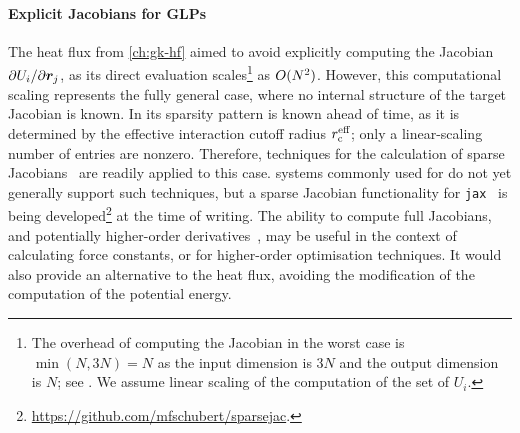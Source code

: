 \paragraph{Explicit Jacobians for GLPs}
The  heat flux from \cref{ch:gk-hf} aimed to avoid explicitly computing the Jacobian $\partial U_{i} / \partial \boldsymbol{r}_{j}$, as its direct evaluation scales\footnote[][-2\baselineskip]{The overhead of computing the Jacobian in the worst case is $\min{(N, 3N)}{=}N$ as the input dimension is $3N$ and the output dimension is $N$; see \cite[ch.~7]{griewank2008}. We assume linear scaling of the computation of the set of $U_i$.} as $O(N^2)$.
However, this computational scaling represents the fully general case, where no internal structure of the target Jacobian is known. In \glps its sparsity pattern is known ahead of time, as it is determined by the effective interaction cutoff radius $r_{\text{c}}^{\text{eff}}$; only a linear-scaling number of entries are nonzero. Therefore, techniques for the calculation of sparse Jacobians~\cite[ch.~7]{griewank2008} are readily applied to this case. \ad systems commonly used for \mlps do not yet generally support such techniques, but a sparse Jacobian functionality for \texttt{jax}~\cite{jax} is being developed\footnote{\url{https://github.com/mfschubert/sparsejac}.} at the time of writing.
The ability to compute full Jacobians, and potentially higher-order derivatives~\cite{smc2022q}, may be useful in the context of calculating force constants, or for higher-order optimisation techniques.
It would also provide an alternative to the  heat flux, avoiding the modification of the computation of the potential energy.

